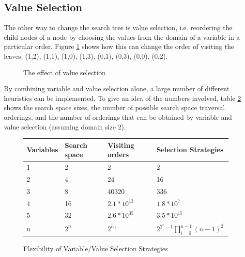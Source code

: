 \subsection{Value Selection}

The other way to change the search tree is value selection, i.e. reordering
the child nodes of a node by choosing the 
values from the domain of a variable in a particular order.
Figure \ref{figvalsel} shows how this can change the order of visiting the
leaves:
(1,2), (1,1), (1,0), (1,3), (0,1), (0,3), (0,0), (0,2).

\begin{figure}
\begin{center}
\end{center}
\caption{The effect of value selection}
\label{figvalsel}
\end{figure}

By combining variable and value selection alone, a large number of different
heuristics can be implemented.
To give an idea of the numbers involved, table \ref{visits} shows the search
space sizes, the number of possible search space traversal orderings,
and the number of orderings
that can be obtained by variable and value selection (assuming domain size 2).

\begin{figure}[t]
\enableunderscores
\begin{center}
\begin{tabular}{|l|l|l|l|}
\hline
Variables&      Search space&   Visiting orders&        Selection Strategies\\
\hline
1&              2&                      2&              2\\
2&              4&                      24&             16\\
3&              8&                      40320&          336\\
4&              16&                     $2.1*10^{13}$&  $1.8*10^7$\\
5&              32&                     $2.6*10^{35}$&  $3.5*10^{15}$\\
n&              $2^n$&          $2^n!$& 
                                $2^{{2^n}-1} \prod_{i=0}^{n-1} (n-1)^{2^i}$\\
\hline
\end{tabular}
\end{center}
\caption{Flexibility of Variable/Value Selection Strategies}
\label{visits}
\disableunderscores
\end{figure}

